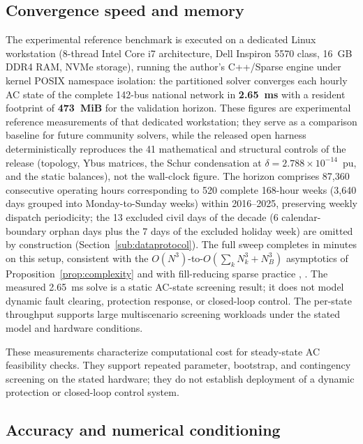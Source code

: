 \subsection{Convergence speed and memory}
\label{sub:speed}

The experimental reference benchmark is executed on a dedicated Linux workstation (8-thread Intel Core i7 architecture, Dell Inspiron 5570 class, 16~GB DDR4 RAM, NVMe storage), running the author's C++/Sparse engine under kernel POSIX namespace isolation: the partitioned solver converges each hourly AC state of the complete 142-bus national network in \textbf{2.65~ms} with a resident footprint of \textbf{473~MiB} for the validation horizon. These figures are experimental reference measurements of that dedicated workstation; they serve as a comparison baseline for future community solvers, while the released open harness deterministically reproduces the 41 mathematical and structural controls of the release (topology, Ybus matrices, the Schur condensation at $\delta = 2.788 \times 10^{-14}$~pu, and the static balances), not the wall-clock figure. The horizon comprises 87,360 consecutive operating hours corresponding to 520 complete 168-hour weeks (3,640 days grouped into Monday-to-Sunday weeks) within 2016--2025, preserving weekly dispatch periodicity; the 13 excluded civil days of the decade (6 calendar-boundary orphan days plus the 7 days of the excluded holiday week) are omitted by construction (Section~\ref{sub:dataprotocol}). The full sweep completes in minutes on this setup, consistent with the $O(N^3)$-to-$O(\sum_k N_k^3 + N_B^3)$ asymptotics of Proposition~\ref{prop:complexity} and with fill-reducing sparse practice \cite{george1973}, \cite{saad2003}. The measured 2.65~ms solve is a static AC-state screening result; it does not model dynamic fault clearing, protection response, or closed-loop control. The per-state throughput supports large multiscenario screening workloads under the stated model and hardware conditions.

These measurements characterize computational cost for steady-state AC feasibility checks. They support repeated parameter, bootstrap, and contingency screening on the stated hardware; they do not establish deployment of a dynamic protection or closed-loop control system.

\subsection{Accuracy and numerical conditioning}
\label{sub:accuracy}

